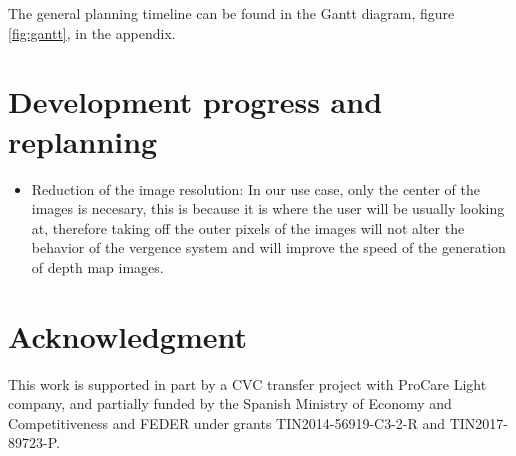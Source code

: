 \documentclass[10pt,a4paper,twocolumn,twoside]{article}
\begin{document}
	The general planning timeline can be found in the Gantt diagram, figure \ref{fig:gantt}, in the appendix.
	
	\section{Development progress and replanning}
	
	\begin{itemize}
		\item Reduction of the image resolution: In our use case, only the center of the images is necesary, this is because it is where the user will be usually looking at, therefore taking off the outer pixels of the images will not alter the behavior of the vergence system and will improve the speed of the generation of depth map images.
	\end{itemize}

	
	
	\section{Acknowledgment}
	This work is supported in part by a CVC transfer project with ProCare Light company, and partially funded by the Spanish Ministry of Economy and Competitiveness and FEDER under grants TIN2014-56919-C3-2-R and TIN2017-89723-P.
	
	
	
	
	\appendix
	
\end{document}
